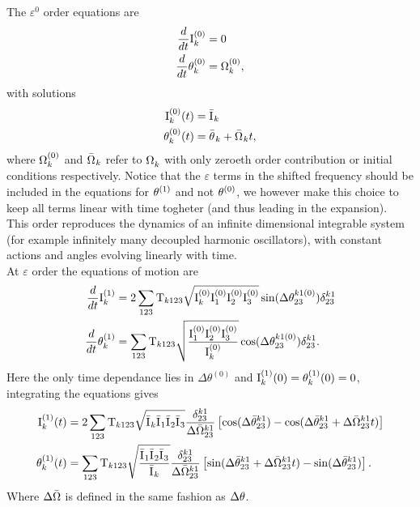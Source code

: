 The $\varepsilon^0$ order equations are
\begin{align}
    \frac{d}{dt}\mathrm{I}^{(0)}_k &= 0   \\
    \frac{d}{dt}\theta^{(0)}_k &= \Omega^{(0)}_k, 
\end{align}
with solutions 
\begin{align}
    \mathrm{I}^{(0)}_k(t) &= \bar{\mathrm{I}^{}}_k \label{solzero1}\\
    \theta^{(0)}_k(t) &= \bar{\theta^{}}_k + \bar{\Omega^{}}_kt, \label{solzero2}
\end{align}
where $\Omega^{(0)}_k$ and $\bar{\Omega^{}}_k$ refer to $\Omega^{}_k$ with only zeroeth order contribution or initial conditions respectively.
Notice that the $\varepsilon$ terms in 
the shifted frequency should be included in the equations for $\theta^{(1)}$ and not $\theta^{(0)}$, we however make this choice to keep 
all terms linear with time togheter (and thus leading in the expansion).\\
This order reproduces the dynamics of an infinite dimensional integrable system (for example infinitely many decoupled harmonic oscillators), with constant actions and angles evolving linearly with time. \\

At $\varepsilon$ order the equations of motion are 
\begin{align}
    \frac{d}{dt}\mathrm{I}^{(1)}_k &= 2\sum_{123} \mathrm{T}_{k123} \sqrt{\mathrm{I}^{(0)}_k\mathrm{I}^{(0)}_1\mathrm{I}^{(0)}_2\mathrm{I}^{(0)}_3} \sin(\Delta\theta^{k1(0)}_{23})\delta^{k1}_{23} \label{hameqone}\\
    \frac{d}{dt}\theta^{(1)}_k &= \sum_{123} \mathrm{T}_{k123} \sqrt{\frac{\mathrm{I}^{(0)}_1\mathrm{I}^{(0)}_2\mathrm{I}^{(0)}_3}{\mathrm{I}^{(0)}_k}}\cos(\Delta\theta^{k1(0)}_{23})\delta^{k1}_{23}.
\end{align}
Here the only time dependance lies in $\Delta\theta^{(0)}$ and $\mathrm{I}^{(1)}_k(0) = \theta^{(1)}_k(0) = 0$, integrating the equations gives
\begin{align}
    \mathrm{I}^{(1)}_k(t) &= 2\sum_{123} \mathrm{T}_{k123} \sqrt{\bar{\mathrm{I}^{}}_k\bar{\mathrm{I}^{}}_1\bar{\mathrm{I}^{}}_2\bar{\mathrm{I}^{}}_3} \frac{\delta^{k1}_{23}}{\Delta\bar{\Omega}^{k1}_{23}}
    \left[ \cos(\Delta\bar{\theta}^{k1}_{23}) - \cos(\Delta\bar{\theta}^{k1}_{23} + \Delta\bar{\Omega}^{k1}_{23}t) \right] \label{solone1}\\
    \theta^{(1)}_k(t) &= \sum_{123} \mathrm{T}_{k123} \sqrt{\frac{\bar{\mathrm{I}^{}}_1\bar{\mathrm{I}^{}}_2\bar{\mathrm{I}^{}}_3}{\bar{\mathrm{I}^{}}_k}} \frac{\delta^{k1}_{23}}{\Delta\bar{\Omega}^{k1}_{23}}
    \left[ \sin(\Delta\bar{\theta}^{k1}_{23} + \Delta\bar{\Omega}^{k1}_{23}t) -\sin(\Delta\bar{\theta}^{k1}_{23}) \right]. \label{solone2}
\end{align}
Where $\Delta\bar{\Omega}$ is defined in the same fashion as $\Delta\theta$. \\

